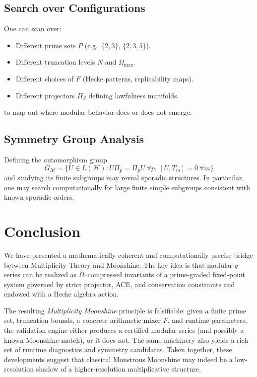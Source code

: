 \documentclass[11pt]{article}
\theoremstyle{definition}
\theoremstyle{plain}
\theoremstyle{remark}
\newcommand{\Hcal}{\mathcal{H}}
\newcommand{\Mcal}{\mathcal{M}}
\newcommand{\OmegaVal}{\Omega}
\begin{document}
\subsection{Search over Configurations}

One can scan over:
\begin{itemize}[leftmargin=1.5em]
  \item Different prime sets $P$ (e.g.\ $\{2,3\}$, $\{2,3,5\}$).
  \item Different truncation levels $N$ and $\OmegaVal_{\max}$.
  \item Different choices of $F$ (Hecke patterns, replicability maps).
  \item Different projectors $\Pi_S$ defining lawfulness manifolds.
\end{itemize}
to map out where modular behavior does or does not emerge.

\subsection{Symmetry Group Analysis}

Defining the automorphism group
\[
  G_{\Mcal} = \{U \in L(\Hcal): U \Pi_p = \Pi_p U\ \forall p,\ [U, T_m] = 0\ \forall m\}
\]
and studying its finite subgroups may reveal sporadic structures.
In particular, one may search computationally for large finite simple subgroups consistent with known sporadic orders.

\section{Conclusion}

We have presented a mathematically coherent and computationally precise bridge between Multiplicity Theory and Moonshine.
The key idea is that modular $q$--series can be realized as $\OmegaVal$--compressed invariants of a prime-graded fixed-point system governed by strict projector, ACE, and conservation constraints and endowed with a Hecke algebra action.

The resulting \emph{Multiplicity Moonshine} principle is falsifiable: given a finite prime set, truncation bounds, a concrete arithmetic mixer $F$, and runtime parameters, the validation engine either produces a certified modular series (and possibly a known Moonshine match), or it does not.
The same machinery also yields a rich set of runtime diagnostics and symmetry candidates.
Taken together, these developments suggest that classical Monstrous Moonshine may indeed be a low-resolution shadow of a higher-resolution multiplicative structure.
\end{document}
